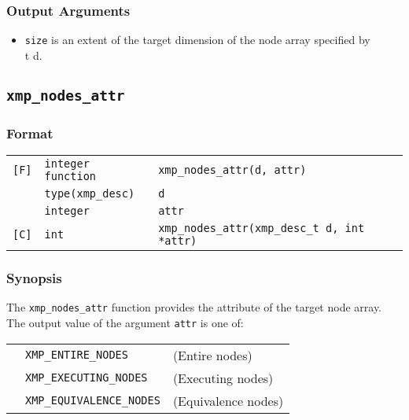 \subsubsection*{Output Arguments}

\begin{itemize}
 \item {\tt size} is an extent of the target dimension of the node array
       specified by {\\t d}.
\end{itemize}


\subsection{\tt xmp\_nodes\_attr}\label{sub:xmpnodesattr}

\subsubsection*{Format}

\begin{tabular}{lll}

\verb![F]!& {\tt integer function}& {\tt xmp\_nodes\_attr(d, attr)}\\
          & {\tt type(xmp\_desc)} & {\tt d}\\
          & {\tt integer} & {\tt attr}\\

\verb![C]!&  {\tt int}& {\tt xmp\_nodes\_attr(xmp\_desc\_t d, int *attr)}\\

\end{tabular}

\subsubsection*{Synopsis}

The {\tt xmp\_nodes\_attr} function provides the attribute of the target
node array. The output value of the argument {\tt attr} is one of:

\begin{tabular}{lll}
  \hspace{2.5cm} & {\tt XMP\_ENTIRE\_NODES} & (Entire nodes)\\
                 & {\tt XMP\_EXECUTING\_NODES}  & (Executing nodes) \\
                 & {\tt XMP\_EQUIVALENCE\_NODES} & (Equivalence nodes) \\
\end{tabular}

